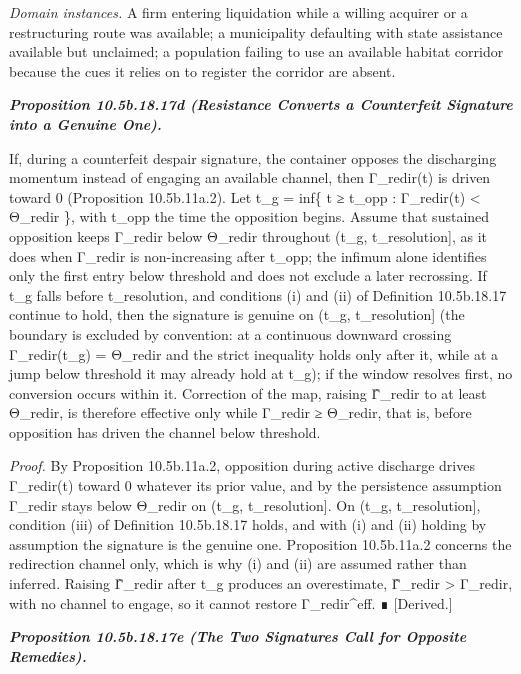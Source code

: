 \documentclass[
]{article}
\begin{document}
\emph{Domain instances.} A firm entering liquidation while a willing
acquirer or a restructuring route was available; a municipality
defaulting with state assistance available but unclaimed; a population
failing to use an available habitat corridor because the cues it relies
on to register the corridor are absent.

\emph{\textbf{Proposition 10.5b.18.17d (Resistance Converts a
Counterfeit Signature into a Genuine One).}}

If, during a counterfeit despair signature, the container opposes the
discharging momentum instead of engaging an available channel, then
Γ\_redir(t) is driven toward 0 (Proposition 10.5b.11a.2). Let t\_g =
inf\{ t ≥ t\_opp : Γ\_redir(t) \textless{} Θ\_redir \}, with t\_opp the
time the opposition begins. Assume that sustained opposition keeps
Γ\_redir below Θ\_redir throughout (t\_g, t\_resolution{]}, as it does
when Γ\_redir is non-increasing after t\_opp; the infimum alone
identifies only the first entry below threshold and does not exclude a
later recrossing. If t\_g falls before t\_resolution, and conditions (i)
and (ii) of Definition 10.5b.18.17 continue to hold, then the signature
is genuine on (t\_g, t\_resolution{]} (the boundary is excluded by
convention: at a continuous downward crossing Γ\_redir(t\_g) = Θ\_redir
and the strict inequality holds only after it, while at a jump below
threshold it may already hold at t\_g); if the window resolves first, no
conversion occurs within it. Correction of the map, raising Γ̂\_redir to
at least Θ\_redir, is therefore effective only while Γ\_redir ≥
Θ\_redir, that is, before opposition has driven the channel below
threshold.

\emph{Proof.} By Proposition 10.5b.11a.2, opposition during active
discharge drives Γ\_redir(t) toward 0 whatever its prior value, and by
the persistence assumption Γ\_redir stays below Θ\_redir on (t\_g,
t\_resolution{]}. On (t\_g, t\_resolution{]}, condition (iii) of
Definition 10.5b.18.17 holds, and with (i) and (ii) holding by
assumption the signature is the genuine one. Proposition 10.5b.11a.2
concerns the redirection channel only, which is why (i) and (ii) are
assumed rather than inferred. Raising Γ̂\_redir after t\_g produces an
overestimate, Γ̂\_redir \textgreater{} Γ\_redir, with no channel to
engage, so it cannot restore Γ\_redir\^{}eff. ∎ {[}Derived.{]}

\emph{\textbf{Proposition 10.5b.18.17e (The Two Signatures Call for
Opposite Remedies).}}
\end{document}
